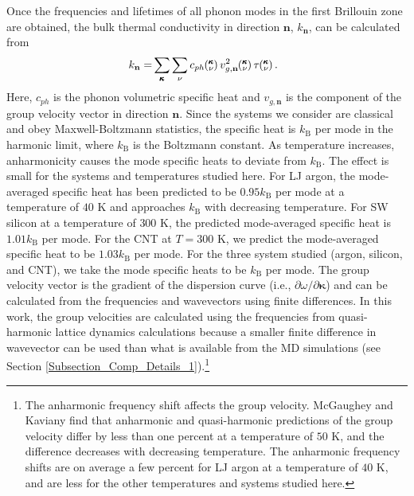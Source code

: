 \documentclass[aps,prb,preprint,superscriptaddress,amsmath,amssymb,floatfix]{revtex4}
\newcommand{\kv}{\mspace{-4.0mu}\left(\mspace{-8.0mu}\begin{smallmatrix}&\pmb{\kappa} \\&\nu\end{smallmatrix}\mspace{-3.0mu}\right)}
\begin{document}
Once the frequencies and lifetimes of all phonon modes in the first
Brillouin zone are obtained, the bulk thermal conductivity in direction
$\mathbf{n}$, $k_{\mathbf{n}}$, can be calculated from \cite{ziman2001}
\begin{equation}\label{E-size:k_bulk}\
\begin{split}
k_{\mathbf{n}}=&\sum_{\pmb{\kappa}} \sum_\nu c_{ph} \kv v^{2}_{g,\mathbf{n}} \kv \tau \kv.
\end{split}
\end{equation}
Here, $c_{ph}$ is the phonon volumetric specific heat and ${v}_{g,\mathbf{n}}$ is
the component of the group velocity vector in direction $\mathbf{n}$. Since the systems we consider are classical and obey Maxwell-Boltzmann statistics,\cite{mcquarrie2000} the
specific heat is $k_{\mathrm{B}}$ per mode in the harmonic limit, where $k_{\mathrm{B}}$ is the Boltzmann constant. As temperature increases, anharmonicity causes the mode specific heats to deviate from $k_{\mathrm{B}}$.\cite{mcgaughey2004c} The effect is small for the systems and temperatures studied here. For LJ argon, the mode-averaged specific heat has been predicted to be $0.95k_{\mathrm{B}}$ per mode at a temperature of $40$ K and approaches $k_{\mathrm{B}}$ with decreasing temperature.\cite{mcgaughey2004c} For SW silicon at a temperature of $300$ K, the predicted mode-averaged specific heat is $1.01k_{\mathrm{B}}$ per mode.\cite{goicochea2010} For the CNT at $T=300$ K, we predict the mode-averaged specific heat to be $1.03k_{\mathrm{B}}$ per mode. For the three system studied (argon, silicon, and CNT), we take the mode specific heats to be $k_{\mathrm{B}}$ per mode.  The group
velocity vector is the gradient of the dispersion curve (i.e., $\partial \omega / \partial \pmb{\kappa}$) and can be calculated from the frequencies and wavevectors using finite differences. In this work, the group velocities are calculated using the frequencies from quasi-harmonic lattice dynamics calculations because a smaller finite difference in wavevector can be used than what is available from the MD simulations (see Section \ref{Subsection_Comp_Details_1}).\footnote[2]{The anharmonic frequency shift affects the group velocity. McGaughey and Kaviany find that anharmonic and quasi-harmonic predictions of the group velocity differ by less than one percent at a temperature of $50$ K, and the difference decreases with decreasing temperature.\cite{mcgaughey2004c} The anharmonic frequency shifts are on average a few percent for LJ argon at a temperature of $40$ K, and are less for the other temperatures and systems studied here.}
\end{document}
